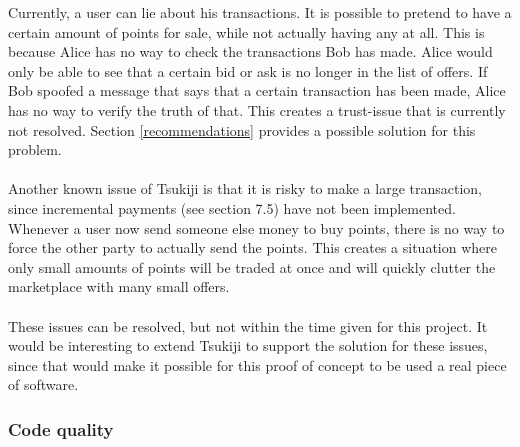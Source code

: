 Currently, a user can lie about his transactions.
It is possible to pretend to have a certain amount of points for sale, while not actually having any at all.
This is because Alice has no way to check the transactions Bob has made.
Alice would only be able to see that a certain bid or ask is no longer in the list of offers.
If Bob spoofed a message that says that a certain transaction has been made, Alice has no way to verify the truth of that.
This creates a trust-issue that is currently not resolved.
Section \ref{recommendations} provides a possible solution for this problem.\\
\\
Another known issue of Tsukiji is that it is risky to make a large transaction, since incremental payments (see section 7.5) have not been implemented.
Whenever a user now send someone else money to buy points, there is no way to force the other party to actually send the points.
This creates a situation where only small amounts of points will be traded at once and will quickly clutter the marketplace with many small offers.\\
\\
These issues can be resolved, but not within the time given for this project.
It would be interesting to extend Tsukiji to support the solution for these issues, since that would make it possible for this proof of concept to be used a real piece of software.



\subsubsection{Code quality}
